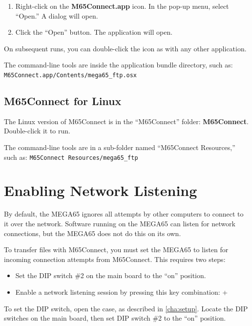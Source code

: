\begin{enumerate}
\item Right-click on the {\bf M65Connect.app} icon. In the pop-up menu, select ``Open.'' A dialog will open.
\item Click the ``Open'' button. The application will open.
\end{enumerate}

On subsequent runs, you can double-click the icon as with any other application.

The command-line tools are inside the application bundle directory, such as: {\tt M65Connect.app/Contents/mega65\_ftp.osx}

\subsection{M65Connect for Linux}

The Linux version of M65Connect is in the ``M65Connect'' folder: {\bf M65Connect}. Double-click it to run.

The command-line tools are in a sub-folder named ``M65Connect Resources,'' such as: {\tt M65Connect Resources/mega65\_ftp}

\section{Enabling Network Listening}

By default, the MEGA65 ignores all attempts by other computers to connect to it over the network. Software running on the MEGA65 can listen for network connections, but the MEGA65 does not do this on its own.

To transfer files with M65Connect, you must set the MEGA65 to listen for incoming connection attempts from M65Connect. This requires two steps:

\begin{itemize}
\item Set the DIP switch \#2 on the main board to the ``on'' position.
\item Enable a network listening session by pressing this key combination:  + \megakey{\pounds}
\end{itemize}

To set the DIP switch, open the case, as described in \vref{cha:setup}. Locate the DIP switches on the main board, then set DIP switch \#2 to the ``on'' position.

